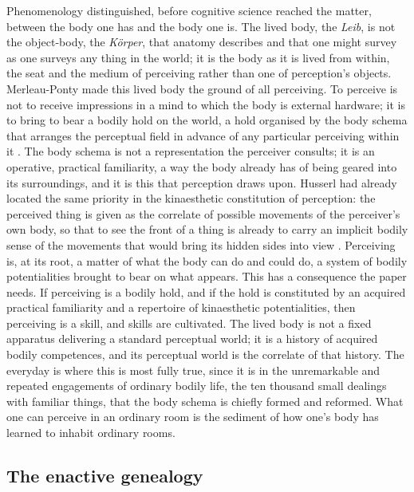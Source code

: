 Phenomenology distinguished, before cognitive science reached the matter, between the body one has and the body one is. The lived body, the \emph{Leib}, is not the object-body, the \emph{K\"{o}rper}, that anatomy describes and that one might survey as one surveys any thing in the world; it is the body as it is lived from within, the seat and the medium of perceiving rather than one of perception's objects. Merleau-Ponty made this lived body the ground of all perceiving. To perceive is not to receive impressions in a mind to which the body is external hardware; it is to bring to bear a bodily hold on the world, a hold organised by the body schema that arranges the perceptual field in advance of any particular perceiving within it \parencite{merleau-ponty1962}. The body schema is not a representation the perceiver consults; it is an operative, practical familiarity, a way the body already has of being geared into its surroundings, and it is this that perception draws upon. Husserl had already located the same priority in the kinaesthetic constitution of perception: the perceived thing is given as the correlate of possible movements of the perceiver's own body, so that to see the front of a thing is already to carry an implicit bodily sense of the movements that would bring its hidden sides into view \parencite{husserl2001}. Perceiving is, at its root, a matter of what the body can do and could do, a system of bodily potentialities brought to bear on what appears. This has a consequence the paper needs. If perceiving is a bodily hold, and if the hold is constituted by an acquired practical familiarity and a repertoire of kinaesthetic potentialities, then perceiving is a skill, and skills are cultivated. The lived body is not a fixed apparatus delivering a standard perceptual world; it is a history of acquired bodily competences, and its perceptual world is the correlate of that history. The everyday is where this is most fully true, since it is in the unremarkable and repeated engagements of ordinary bodily life, the ten thousand small dealings with familiar things, that the body schema is chiefly formed and reformed. What one can perceive in an ordinary room is the sediment of how one's body has learned to inhabit ordinary rooms.

\subsection{The enactive genealogy}
\label{p23:sub:body-enactive}

